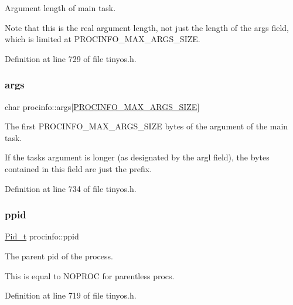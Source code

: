Argument length of main task. 

Note that this is the real argument length, not just the length of the {\ttfamily args} field, which is limited at {\ttfamily P\+R\+O\+C\+I\+N\+F\+O\+\_\+\+M\+A\+X\+\_\+\+A\+R\+G\+S\+\_\+\+S\+I\+ZE}. 

Definition at line 729 of file tinyos.\+h.

\mbox{\label{structprocinfo_ac812ea3215fafc8ced9f91320b2d3959}} 
\subsubsection{\texorpdfstring{args}{args}}
{\footnotesize\ttfamily char procinfo\+::args\mbox{[}\hyperlink{group__syscalls_ga657ad9e9d81dcca25fb225cf99051e0d}{P\+R\+O\+C\+I\+N\+F\+O\+\_\+\+M\+A\+X\+\_\+\+A\+R\+G\+S\+\_\+\+S\+I\+ZE}\mbox{]}}



The first {\ttfamily P\+R\+O\+C\+I\+N\+F\+O\+\_\+\+M\+A\+X\+\_\+\+A\+R\+G\+S\+\_\+\+S\+I\+ZE} bytes of the argument of the main task. 

If the task\textquotesingle{}s argument is longer (as designated by the {\ttfamily argl} field), the bytes contained in this field are just the prefix. 

Definition at line 734 of file tinyos.\+h.

\mbox{\label{structprocinfo_a790970c70987013b2712b7dd6d2b75b9}} 
\subsubsection{\texorpdfstring{ppid}{ppid}}
{\footnotesize\ttfamily \hyperlink{group__syscalls_gafac07f3170763932fac97b6eab2c3984}{Pid\+\_\+t} procinfo\+::ppid}



The parent pid of the process. 

This is equal to N\+O\+P\+R\+OC for parentless procs. 

Definition at line 719 of file tinyos.\+h.

\mbox{\label{structprocinfo_ae1ed3afa8904729a1daf1b51780cf2cf}} 
